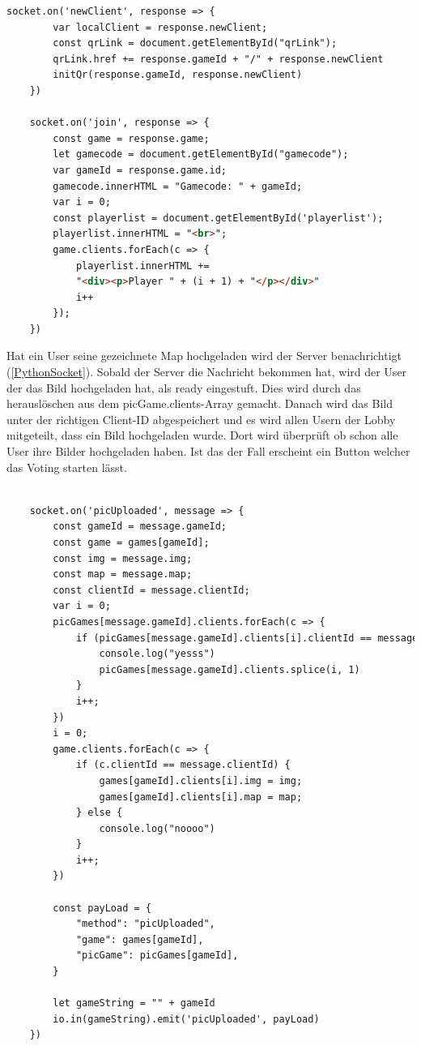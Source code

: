 \begin{lstlisting}[language=html,caption=Join Game Client ]
    socket.on('newClient', response => {
        var localClient = response.newClient;
        const qrLink = document.getElementById("qrLink");
        qrLink.href += response.gameId + "/" + response.newClient
        initQr(response.gameId, response.newClient)
    })

    socket.on('join', response => {
        const game = response.game;
        let gamecode = document.getElementById("gamecode");
        var gameId = response.game.id;
        gamecode.innerHTML = "Gamecode: " + gameId;
        var i = 0;
        const playerlist = document.getElementById('playerlist');
        playerlist.innerHTML = "<br>";
        game.clients.forEach(c => {
            playerlist.innerHTML +=
            "<div><p>Player " + (i + 1) + "</p></div>"
            i++
        });
    })
\end{lstlisting}


Hat ein User seine gezeichnete Map hochgeladen wird der Server benachrichtigt (\ref{PythonSocket}).
Sobald der Server die Nachricht bekommen hat, wird der User der das Bild hochgeladen hat, als ready eingestuft. Dies wird durch das herauslöschen aus dem picGame.clients-Array gemacht.
Danach wird das Bild unter der richtigen Client-ID abgespeichert und es wird allen Usern der Lobby mitgeteilt, dass ein Bild hochgeladen wurde.
Dort wird überprüft ob schon alle User ihre Bilder hochgeladen haben. Ist das der Fall erscheint ein Button welcher das Voting starten lässt.
\begin{lstlisting}[language=html,caption=picUploaded Server]

    socket.on('picUploaded', message => {
        const gameId = message.gameId;
        const game = games[gameId];
        const img = message.img;
        const map = message.map;
        const clientId = message.clientId;
        var i = 0;
        picGames[message.gameId].clients.forEach(c => {
            if (picGames[message.gameId].clients[i].clientId == message.clientId) {
                console.log("yesss")
                picGames[message.gameId].clients.splice(i, 1)
            }
            i++;
        })
        i = 0;
        game.clients.forEach(c => {
            if (c.clientId == message.clientId) {
                games[gameId].clients[i].img = img;
                games[gameId].clients[i].map = map;
            } else {
                console.log("noooo")
            }
            i++;
        })

        const payLoad = {
            "method": "picUploaded",
            "game": games[gameId],
            "picGame": picGames[gameId],
        }

        let gameString = "" + gameId
        io.in(gameString).emit('picUploaded', payLoad)
    })
    
\end{lstlisting}

